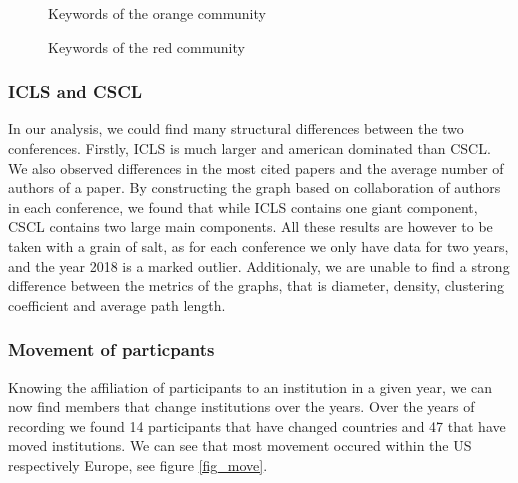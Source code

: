 \documentclass[article,twocolumn]{IEEEtran}
\begin{document}
    \begin{figure}
        \begin{center}\end{center}
        \caption{Keywords of the orange community}
        \label{c2}
    \end{figure}
    

    \begin{figure}
        \begin{center}\end{center}
        \caption{Keywords of the red community}
        \label{c3}
    \end{figure}
    
    \hypertarget{icls-and-cscl}{%
\subsubsection{ICLS and CSCL}\label{icls-and-cscl}}

In our analysis, we could find many structural differences between the
two conferences. Firstly, ICLS is much larger and american dominated
than CSCL. We also observed differences in the most cited papers and the
average number of authors of a paper. By constructing the graph based on
collaboration of authors in each conference, we found that while ICLS
contains one giant component, CSCL contains two large main components.
All these results are however to be taken with a grain of salt, as for
each conference we only have data for two years, and the year 2018 is a
marked outlier. Additionaly, we are unable to find a strong difference
between the metrics of the graphs, that is diameter, density, clustering
coefficient and average path length.

    \hypertarget{movement-of-particpants}{%
\subsubsection{Movement of particpants}\label{movement-of-particpants}}

Knowing the affiliation of participants to an institution in a given
year, we can now find members that change institutions over the years.
Over the years of recording we found 14 participants that have changed
countries and 47 that have moved institutions. We can see that most
movement occured within the US respectively Europe, see figure
\ref{fig_move}.
\end{document}
